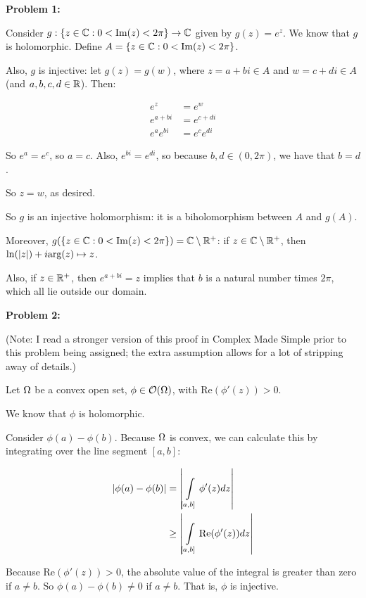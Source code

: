 \documentclass[a4paper,12pt]{article}
\begin{document}
{\bf Problem 1:}

Consider $g: \{z \in \mathbb{C}: 0 < \text{Im}(z) < 2\pi\} \to \mathbb{C}$ given by $g(z) = e^z$. We know that $g$ is holomorphic. Define $A = \{z \in \mathbb{C}: 0 < \text{Im}(z) < 2\pi\}$.

Also, $g$ is injective: let $g(z)=g(w)$, where $z=a+bi \in A$ and $w=c+di \in A$ (and $a,b,c,d \in \mathbb{R}$). Then:

\begin{align*}
e^z&=e^w\\
e^{a+bi} &= e^{c+di}\\
e^ae^{bi} &=e^ce^{di}
\end{align*}

So $e^a=e^c$, so $a=c$. Also, $e^{bi} = e^{di}$, so because $b,d \in (0,2\pi)$, we have that $b=d$. 

So $z=w$, as desired.

So $g$ is an injective holomorphism: it is a biholomorphism between $A$ and $g(A)$.

Moreover, $g(\{z \in \mathbb{C}: 0 < \text{Im}(z) < 2\pi\}) = \mathbb{C} \setminus \mathbb{R}^+$: if $z \in \mathbb{C} \setminus \mathbb{R}^+$, then $\ln(\left\lvert z \right\rvert) + i \text{arg}(z) \mapsto z$.

Also, if $z \in \mathbb{R}^+$, then $e^{a+bi} = z$ implies that $b$ is a natural number times $2\pi$, which all lie outside our domain.

\shunt

{\bf Problem 2:}

(Note: I read a stronger version of this proof in Complex Made Simple prior to this problem being assigned; the extra assumption allows for a lot of stripping away of details.)

Let $\Omega$ be a convex open set, $\phi \in \mathcal{O}(\Omega)$, with $\text{Re}(\phi'(z)) > 0$.

We know that $\phi$ is holomorphic.

Consider $\phi(a)-\phi(b)$. Because $\Omega$ is convex, we can calculate this by integrating over the line segment $[a,b]$:

\begin{align*}
\left\lvert \phi(a)-\phi(b) \right\rvert&= \left\lvert \int\limits_{[a,b]} \phi'(z) dz \right\rvert\\
&\geq \left\lvert \int\limits_{[a,b]} \text{Re}(\phi'(z))dz \right\rvert\\
\end{align*}

Because $\text{Re}(\phi'(z)) >0$, the absolute value of the integral is greater than zero if $a \neq b$. So $\phi(a)-\phi(b) \neq 0$ if $a \neq b$. That is, $\phi$ is injective.
\end{document}
